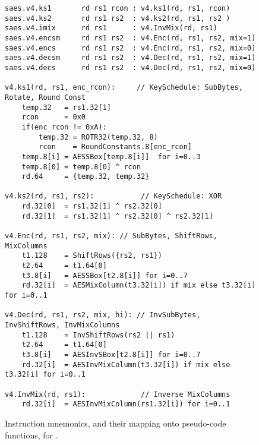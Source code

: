 \begin{figure}[!h]
\begin{lstlisting}[language=pseudo,style=block]
saes.v4.ks1       rd rs1 rcon : v4.ks1(rd, rs1, rcon)
saes.v4.ks2       rd rs1 rs2  : v4.ks2(rd, rs1, rs2 )
saes.v4.imix      rd rs1      : v4.InvMix(rd, rs1)
saes.v4.encsm     rd rs1 rs2  : v4.Enc(rd, rs1, rs2, mix=1)
saes.v4.encs      rd rs1 rs2  : v4.Enc(rd, rs1, rs2, mix=0)
saes.v4.decsm     rd rs1 rs2  : v4.Dec(rd, rs1, rs2, mix=1)
saes.v4.decs      rd rs1 rs2  : v4.Dec(rd, rs1, rs2, mix=0)

v4.ks1(rd, rs1, enc_rcon):     // KeySchedule: SubBytes, Rotate, Round Const
    temp.32   = rs1.32[1]
    rcon      = 0x0
    if(enc_rcon != 0xA):
        temp.32 = ROTR32(temp.32, 8)
        rcon    = RoundConstants.8[enc_rcon]
    temp.8[i] = AESSBox[temp.8[i]]  for i=0..3
    temp.8[0] = temp.8[0] ^ rcon
    rd.64     = {temp.32, temp.32}

v4.ks2(rd, rs1, rs2):           // KeySchedule: XOR
    rd.32[0]  = rs1.32[1] ^ rs2.32[0]
    rd.32[1]  = rs1.32[1] ^ rs2.32[0] ^ rs2.32[1]

v4.Enc(rd, rs1, rs2, mix): // SubBytes, ShiftRows, MixColumns
    t1.128    = ShiftRows({rs2, rs1})
    t2.64     = t1.64[0]
    t3.8[i]   = AESSBox[t2.8[i]] for i=0..7
    rd.32[i]  = AESMixColumn(t3.32[i]) if mix else t3.32[i] for i=0..1

v4.Dec(rd, rs1, rs2, mix, hi): // InvSubBytes, InvShiftRows, InvMixColumns
    t1.128    = InvShiftRows(rs2 || rs1)
    t2.64     = t1.64[0]
    t3.8[i]   = AESInvSBox[t2.8[i]] for i=0..7
    rd.32[i]  = AESInvMixColumn(t3.32[i]) if mix else t3.32[i] for i=0..1

v4.InvMix(rd, rs1):             // Inverse MixColumns
    rd.32[i]  = AESInvMixColumn(rs1.32[i]) for i=0..1
\end{lstlisting}
\caption{
  Instruction mnemonics, and their mapping onto pseudo-code functions, for .
}
\label{fig:v4:pseudo}
\end{figure}

